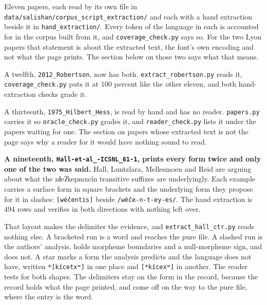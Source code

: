 Eleven papers, each read by its own file in \texttt{data/\allowbreak{}salishan/\allowbreak{}corpus\_\allowbreak{}script\_\allowbreak{}extraction/\allowbreak{}} and each with a hand extraction beside it in \texttt{hand\_\allowbreak{}extraction/\allowbreak{}}. Every token of the language in each is accounted for in the corpus built from it, and \texttt{coverage\_\allowbreak{}check.\allowbreak{}py} says so. For the two Lyon papers that statement is about the extracted text, the font's own encoding and not what the page prints. The section below on those two says what that means.

A twelfth, \texttt{2012\_\allowbreak{}Robertson}, now has both. \texttt{extract\_\allowbreak{}robertson.\allowbreak{}py} reads it, \texttt{coverage\_\allowbreak{}check.\allowbreak{}py} puts it at 100 percent like the other eleven, and both hand-extraction checks grade it.

A thirteenth, \texttt{1975\_\allowbreak{}Hilbert\_\allowbreak{}Hess}, is read by hand and has no reader. \texttt{papers.\allowbreak{}py} carries it so \texttt{oracle\_\allowbreak{}check.\allowbreak{}py} grades it, and \texttt{reader\_\allowbreak{}check.\allowbreak{}py} lists it under the papers waiting for one. The section on papers whose extracted text is not the page says why a reader for it would have nothing sound to read.

\textbf{A nineteenth, \texttt{Hall-\allowbreak{}et-\allowbreak{}al\_\allowbreak{}-\allowbreak{}ICSNL\_\allowbreak{}61-\allowbreak{}1}, prints every form twice and only one of the two was said.} Hall, Luntzlara, Mellesmoen and Reid are arguing about what the nɬeʔkepmxcín transitive suffixes are underlyingly. Each example carries a surface form in square brackets and the underlying form they propose for it in slashes: \texttt{[wéc̓entis]} beside \texttt{/\allowbreak{}wéc̓e-\allowbreak{}n-\allowbreak{}t-\allowbreak{}ey-\allowbreak{}es/\allowbreak{}}. The hand extraction is 494 rows and verifies in both directions with nothing left over.

That layout makes the delimiter the evidence, and \texttt{extract\_\allowbreak{}hall\_\allowbreak{}ctr.\allowbreak{}py} reads nothing else. A bracketed run is a word and reaches the pure file. A slashed run is the authors' analysis, holds morpheme boundaries and a null-morpheme sign, and does not. A star marks a form the analysis predicts and the language does not have, written \texttt{*[kícetxʷ]} in one place and \texttt{[*kícexʷ]} in another. The reader tests for both shapes. The delimiters stay on the form in the record, because the record holds what the page printed, and come off on the way to the pure file, where the entry is the word.

